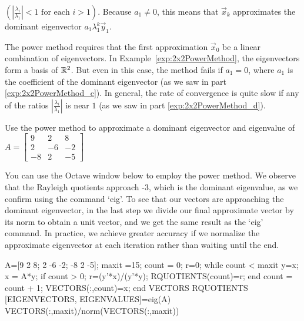 \documentclass{ximera}
\begin{document}
$\left( \left|\frac{\lambda_{i}}{\lambda_{1}} \right| < 1 \mbox{ for each } i > 1 \right)$. Because $a_{1} \neq 0$, this means that $\vec{x}_{k}$ approximates the dominant eigenvector $a_{1}\lambda_{1}^k\vec{y}_{1}$.


The power method requires that the first approximation $\vec{x}_{0}$ be a linear combination of eigenvectors. In Example~\ref{exp:2x2PowerMethod}, the eigenvectors form a basis of $\mathbb{R}^2$. But even in this case, the method fails if $a_{1} = 0$, where $a_{1}$ is the coefficient of the dominant eigenvector (as we saw in part \ref{exp:2x2PowerMethod_c}). In general, the rate of convergence is quite slow if any of the ratios $\left| \frac{\lambda_{i}}{\lambda_{1}} \right|$ is near $1$ (as we saw in part \ref{exp:2x2PowerMethod_d}). 


\begin{exploration}\label{exp:3x3PowerMethod}
Use the power method to approximate a dominant eigenvector and eigenvalue of $A = \left[ \begin{array}{rrr}
9 & 2 & 8 \\
2 & -6 & -2 \\
-8 & 2 & -5
\end{array}\right]$

You can use the Octave window below to employ the power method.  We observe that the Rayleigh quotients approach -3, which is the dominant eigenvalue, as we confirm using the command `eig'.  To see that our vectors are approaching the dominant eigenvector, in the last step we divide our final approximate vector by its norm to obtain a unit vector, and we get the same result as the `eig' command.  In practice, we achieve greater accuracy if we normalize the approximate eigenvector at each iteration rather than waiting until the end.

A=[9 2 8; 2 -6 -2; -8 2 -5]; %
maxit =15; %
count = 0;
r=0;
    while count < maxit
    y=x;
    x = A*y;
        if count > 0; 
        r=(y'*x)/(y'*y);
        RQUOTIENTS(count)=r;
        end
    count = count + 1;
    VECTORS(:,count)=x;
end
VECTORS
RQUOTIENTS
[EIGENVECTORS, EIGENVALUES]=eig(A)
VECTORS(:,maxit)/norm(VECTORS(:,maxit))
\end{exploration}
\end{document}
